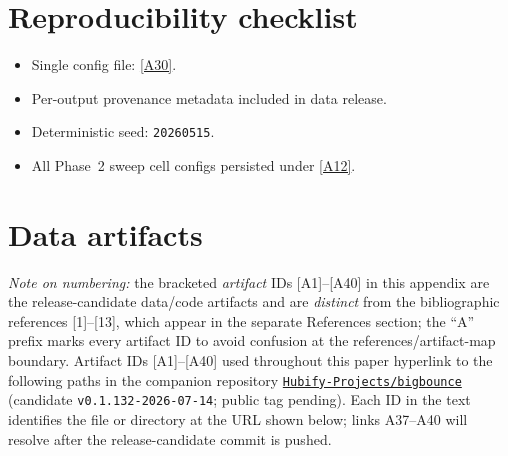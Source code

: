 \documentclass[aps,prd,twocolumn,superscriptaddress,showpacs,preprintnumbers,nofootinbib,longbibliography,floatfix]{revtex4-2}
\newcommand{\repoBase}{https://github.com/Hubify-Projects/bigbounce/blob/main}
\newcommand{\paperVersion}{v0.1.132-2026-07-14}
\begin{document}
\clearpage
\section*{Reproducibility checklist}
\begin{itemize}
\item Single config file:
\href{\repoBase/pipelines/p5\_desi\_chirality/env\_finder/config.yaml}{[A30]}.
\item Per-output provenance metadata included in data release.
\item Deterministic seed: \texttt{20260515}.
\item All Phase~2 sweep cell configs persisted under
\href{\repoBase/pipelines/p5\_desi\_chirality/data/desi\_env/phase2\_sweep}{[A12]}.
\end{itemize}

\section{Data artifacts}\label{app:artifacts}

\emph{Note on numbering:} the bracketed \emph{artifact} IDs
[A1]--[A40] in this appendix are the release-candidate data/code
artifacts and are \emph{distinct} from the bibliographic references
[1]--[13], which appear in the separate References section; the ``A''
prefix marks every artifact ID to avoid confusion at the
references/artifact-map boundary. Artifact IDs [A1]--[A40] used
throughout this paper hyperlink to the following paths in the companion
repository
\href{https://github.com/Hubify-Projects/bigbounce}{\texttt{Hubify-Projects/bigbounce}}
(candidate \texttt{\paperVersion}; public tag pending). Each ID in the
text identifies the file or directory at the URL shown below; links A37--A40
will resolve after the release-candidate commit is pushed.
\end{document}
